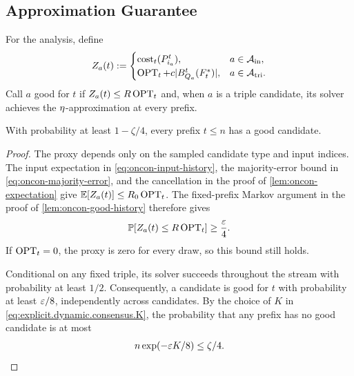 \subsection{Approximation Guarantee}\label{subsec:explicit.consensus.approximation}

For the analysis, define
\begin{align}
    Z_{a}(t):=
    \begin{cases}
        \operatorname{cost}_t(P_{i_a}^t),&a\in\mathcal{A}_{\rm in},\\
        \operatorname{OPT}_t+c|B_{Q_a}^t(F_t^*)|,&a\in\mathcal{A}_{\rm tri}.
    \end{cases}
    \label{eq:explicit.consensus.proxy}
\end{align}
Call $ a $ good for $ t $ if $ Z_{a}(t)\le R\operatorname{OPT}_t $ and, when $ a $ is a triple candidate, its solver achieves the $ \eta $-approximation at every prefix.

\begin{lemma}\label{lem:explicit.good.candidate}
With probability at least $ 1-\zeta/4 $, every prefix $ t\le n $ has a good candidate.
\end{lemma}
\begin{proof}
The proxy depends only on the sampled candidate type and input indices.
The input expectation in \eqref{eq:oncon-input-history}, the majority-error bound in \eqref{eq:oncon-majority-error}, and the cancellation in the proof of \cref{lem:oncon-expectation} give $ \mathbb{E}[Z_{a}(t)]\le R_0\operatorname{OPT}_t $.
The fixed-prefix Markov argument in the proof of \cref{lem:oncon-good-history} therefore gives
\begin{align}
    \mathbb{P}[Z_{a}(t)\le R\operatorname{OPT}_t]\ge\frac{\varepsilon}{4}.
    \label{eq:explicit.consensus.proxy.success}
\end{align}
If $ \operatorname{OPT}_t=0 $, the proxy is zero for every draw, so this bound still holds.

Conditional on any fixed triple, its solver succeeds throughout the stream with probability at least $ 1/2 $.
Consequently, a candidate is good for $ t $ with probability at least $ \varepsilon/8 $, independently across candidates.
By the choice of $ K $ in \eqref{eq:explicit.dynamic.consensus.K}, the probability that any prefix has no good candidate is at most
\begin{align}
    n\exp(-\varepsilon K/8)\le\zeta/4.
    \label{eq:explicit.consensus.candidate.event}
\end{align}
\end{proof}

